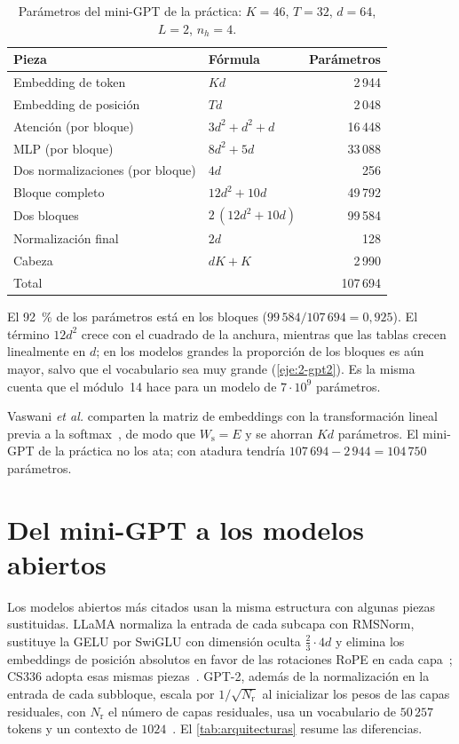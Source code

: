 \begin{table}[h]
\centering\small
\caption{Parámetros del mini-GPT de la práctica: $K=46$, $T=32$, $d=64$, $L=2$, $n_h=4$.}\label{tab:parametros}
\begin{tabular}{@{}llr@{}}
\toprule
Pieza & Fórmula & Parámetros \\
\midrule
Embedding de token & $Kd$ & 2\,944 \\
Embedding de posición & $Td$ & 2\,048 \\
Atención (por bloque) & $3d^{2}+d^{2}+d$ & 16\,448 \\
MLP (por bloque) & $8d^{2}+5d$ & 33\,088 \\
Dos normalizaciones (por bloque) & $4d$ & 256 \\
Bloque completo & $12d^{2}+10d$ & 49\,792 \\
Dos bloques & $2\,(12d^{2}+10d)$ & 99\,584 \\
Normalización final & $2d$ & 128 \\
Cabeza & $dK+K$ & 2\,990 \\
\midrule
Total & & 107\,694 \\
\bottomrule
\end{tabular}
\end{table}

El 92~\% de los parámetros está en los bloques ($99\,584/107\,694=0{,}925$). El término $12d^{2}$ crece con el cuadrado de la anchura, mientras que las tablas crecen linealmente en $d$; en los modelos grandes la proporción de los bloques es aún mayor, salvo que el vocabulario sea muy grande (\cref{eje:2-gpt2}). Es la misma cuenta que el módulo~14 hace para un modelo de $7\cdot 10^{9}$ parámetros.

\begin{observacion}\label{obs:atados}
Vaswani \emph{et al.} comparten la matriz de embeddings con la transformación lineal previa a la softmax~\cite[§3.4]{vaswani}, de modo que $W_{\mathrm{s}}=E$ y se ahorran $Kd$ parámetros. El mini-GPT de la práctica no los ata; con atadura tendría $107\,694-2\,944=104\,750$ parámetros.
\end{observacion}

\section{Del mini-GPT a los modelos abiertos}

Los modelos abiertos más citados usan la misma estructura con algunas piezas sustituidas. LLaMA normaliza la entrada de cada subcapa con RMSNorm, sustituye la GELU por SwiGLU con dimensión oculta $\tfrac23\cdot 4d$ y elimina los embeddings de posición absolutos en favor de las rotaciones RoPE en cada capa~\cite[§2.2]{llama}; CS336 adopta esas mismas piezas~\cite[§3]{cs336}. GPT-2, además de la normalización en la entrada de cada subbloque, escala por $1/\sqrt{N_{\mathrm{r}}}$ al inicializar los pesos de las capas residuales, con $N_{\mathrm{r}}$ el número de capas residuales, usa un vocabulario de $50\,257$ tokens y un contexto de $1024$~\cite[§2.3]{gpt2}. El \cref{tab:arquitecturas} resume las diferencias.

